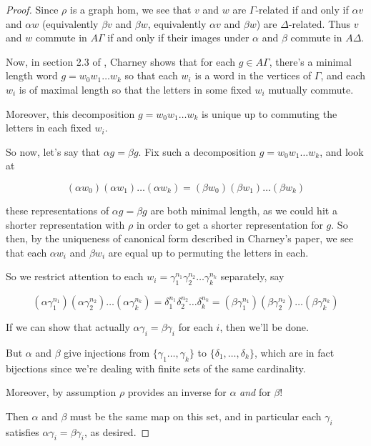 \documentclass[12pt]{article}
\theoremstyle{definition}
\theoremstyle{theorem}
\begin{document}
\begin{proof}
    Since $\rho$ is a graph
    hom, we see that $v$ and $w$ are $\Gamma$-related if and only if $\alpha v$
    and $\alpha w$ (equivalently $\beta v$ and $\beta w$, equivalently $\alpha v$ and $\beta w$) 
    are $\Delta$-related. Thus $v$ and $w$ commute in $A \Gamma$ if and only 
    if their images under $\alpha$ and $\beta$ commute in $A \Delta$.

    Now, in section 2.3 of \cite{charneyIntroductionRightangledArtin2006},
    Charney shows that for each $g \in A\Gamma$,
    there's a minimal length word $g = w_0 w_1 \ldots w_k$ so that each 
    $w_i$ is a word in the vertices of $\Gamma$, and each $w_i$ is of maximal 
    length so that the letters in some fixed $w_i$ mutually commute.

    Moreover, this decomposition $g = w_0 w_1 \ldots w_k$ is unique up to 
    commuting the letters in each fixed $w_i$.

    So now, let's say that $\alpha g = \beta g$. Fix such a decomposition
    $g = w_0 w_1 \ldots w_k$, and look at 

    \[ (\alpha w_0) (\alpha w_1) \ldots (\alpha w_k) = (\beta w_0) (\beta w_1) \ldots (\beta w_k) \]

    these representations of $\alpha g = \beta g$ are both minimal length, as 
    we could hit a shorter representation with $\rho$ in order to get a 
    shorter representation for $g$. So then, by the uniqueness of canonical form 
    described in Charney's paper, 
    we see that each $\alpha w_i$ and $\beta w_i$ are equal up to permuting the 
    letters in each. 
    
    So we restrict attention to each 
    $w_i = \gamma_1^{n_1} \gamma_2^{n_2} \ldots \gamma_k^{n_k}$ separately, say

    \[ 
    (\alpha \gamma_1^{n_1}) (\alpha \gamma_2^{n_2}) \ldots (\alpha \gamma_k^{n_k}) = 
    \delta_1^{n_1} \delta_2^{n_2} \ldots \delta_k^{n_k} =
    (\beta \gamma_1^{n_1}) (\beta \gamma_2^{n_2}) \ldots (\beta \gamma_k^{n_k})
    \]

    If we can show that actually $\alpha \gamma_i = \beta \gamma_i$ for each $i$,
    then we'll be done.

    But $\alpha$ and $\beta$ give injections from $\{ \gamma_1 \ldots, \gamma_k \}$
    to $\{ \delta_1, \ldots, \delta_k \}$, which are in fact bijections since we're
    dealing with finite sets of the same cardinality. 

    Moreover, by assumption $\rho$ provides an inverse for $\alpha$ \emph{and} 
    for $\beta$!

    Then $\alpha$ and $\beta$ must be the same map on this set, and in particular
    each $\gamma_i$ satisfies $\alpha \gamma_i = \beta \gamma_i$, as desired.
\end{proof}
\end{document}
